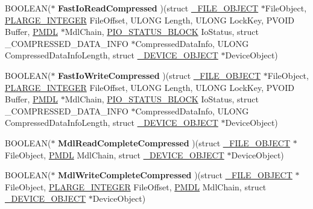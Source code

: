 \begin{DoxyCompactItemize}
\item 
\hypertarget{struct__FAST__IO__DISPATCH_a8cab70eae7f2b204727b2441ce231f77}{}B\+O\+O\+L\+E\+A\+N($\ast$ {\bfseries Fast\+Io\+Read\+Compressed} )(struct \hyperlink{struct__FILE__OBJECT}{\+\_\+\+F\+I\+L\+E\+\_\+\+O\+B\+J\+E\+C\+T} $\ast$File\+Object, \hyperlink{union__LARGE__INTEGER}{P\+L\+A\+R\+G\+E\+\_\+\+I\+N\+T\+E\+G\+E\+R} File\+Offset, U\+L\+O\+N\+G Length, U\+L\+O\+N\+G Lock\+Key, P\+V\+O\+I\+D Buffer, \hyperlink{struct__MDL}{P\+M\+D\+L} $\ast$Mdl\+Chain, \hyperlink{struct__IO__STATUS__BLOCK}{P\+I\+O\+\_\+\+S\+T\+A\+T\+U\+S\+\_\+\+B\+L\+O\+C\+K} Io\+Status, struct \+\_\+\+C\+O\+M\+P\+R\+E\+S\+S\+E\+D\+\_\+\+D\+A\+T\+A\+\_\+\+I\+N\+F\+O $\ast$Compressed\+Data\+Info, U\+L\+O\+N\+G Compressed\+Data\+Info\+Length, struct \hyperlink{struct__DEVICE__OBJECT}{\+\_\+\+D\+E\+V\+I\+C\+E\+\_\+\+O\+B\+J\+E\+C\+T} $\ast$Device\+Object)\label{struct__FAST__IO__DISPATCH_a8cab70eae7f2b204727b2441ce231f77}

\item 
\hypertarget{struct__FAST__IO__DISPATCH_aa37e60457167818ccec9d6eb5ebb4730}{}B\+O\+O\+L\+E\+A\+N($\ast$ {\bfseries Fast\+Io\+Write\+Compressed} )(struct \hyperlink{struct__FILE__OBJECT}{\+\_\+\+F\+I\+L\+E\+\_\+\+O\+B\+J\+E\+C\+T} $\ast$File\+Object, \hyperlink{union__LARGE__INTEGER}{P\+L\+A\+R\+G\+E\+\_\+\+I\+N\+T\+E\+G\+E\+R} File\+Offset, U\+L\+O\+N\+G Length, U\+L\+O\+N\+G Lock\+Key, P\+V\+O\+I\+D Buffer, \hyperlink{struct__MDL}{P\+M\+D\+L} $\ast$Mdl\+Chain, \hyperlink{struct__IO__STATUS__BLOCK}{P\+I\+O\+\_\+\+S\+T\+A\+T\+U\+S\+\_\+\+B\+L\+O\+C\+K} Io\+Status, struct \+\_\+\+C\+O\+M\+P\+R\+E\+S\+S\+E\+D\+\_\+\+D\+A\+T\+A\+\_\+\+I\+N\+F\+O $\ast$Compressed\+Data\+Info, U\+L\+O\+N\+G Compressed\+Data\+Info\+Length, struct \hyperlink{struct__DEVICE__OBJECT}{\+\_\+\+D\+E\+V\+I\+C\+E\+\_\+\+O\+B\+J\+E\+C\+T} $\ast$Device\+Object)\label{struct__FAST__IO__DISPATCH_aa37e60457167818ccec9d6eb5ebb4730}

\item 
\hypertarget{struct__FAST__IO__DISPATCH_a62f54ab2112365011705576ff5426090}{}B\+O\+O\+L\+E\+A\+N($\ast$ {\bfseries Mdl\+Read\+Complete\+Compressed} )(struct \hyperlink{struct__FILE__OBJECT}{\+\_\+\+F\+I\+L\+E\+\_\+\+O\+B\+J\+E\+C\+T} $\ast$File\+Object, \hyperlink{struct__MDL}{P\+M\+D\+L} Mdl\+Chain, struct \hyperlink{struct__DEVICE__OBJECT}{\+\_\+\+D\+E\+V\+I\+C\+E\+\_\+\+O\+B\+J\+E\+C\+T} $\ast$Device\+Object)\label{struct__FAST__IO__DISPATCH_a62f54ab2112365011705576ff5426090}

\item 
\hypertarget{struct__FAST__IO__DISPATCH_adb9164bf16e1f12997cba0d264d42768}{}B\+O\+O\+L\+E\+A\+N($\ast$ {\bfseries Mdl\+Write\+Complete\+Compressed} )(struct \hyperlink{struct__FILE__OBJECT}{\+\_\+\+F\+I\+L\+E\+\_\+\+O\+B\+J\+E\+C\+T} $\ast$File\+Object, \hyperlink{union__LARGE__INTEGER}{P\+L\+A\+R\+G\+E\+\_\+\+I\+N\+T\+E\+G\+E\+R} File\+Offset, \hyperlink{struct__MDL}{P\+M\+D\+L} Mdl\+Chain, struct \hyperlink{struct__DEVICE__OBJECT}{\+\_\+\+D\+E\+V\+I\+C\+E\+\_\+\+O\+B\+J\+E\+C\+T} $\ast$Device\+Object)\label{struct__FAST__IO__DISPATCH_adb9164bf16e1f12997cba0d264d42768}


\end{DoxyCompactItemize}
